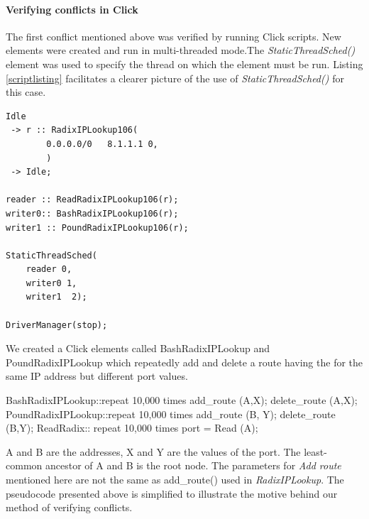 \documentclass{article}
\begin{document}
\paragraph{Verifying conflicts in Click}
The first conflict mentioned above was verified by running Click scripts. New elements were created and run in multi-threaded mode.The \emph{StaticThreadSched()} element was used to specify the thread on which the element must be run. Listing \ref{scriptlisting} facilitates a clearer picture of the use of \emph{StaticThreadSched()} for this case.
\begin{lstlisting}[caption = Click script for verifying reader-updater conflicts, label=scriptlisting]
Idle
 -> r :: RadixIPLookup106(
		0.0.0.0/0   8.1.1.1 0,
		) 
 -> Idle;

reader :: ReadRadixIPLookup106(r);
writer0:: BashRadixIPLookup106(r);
writer1 :: PoundRadixIPLookup106(r);

StaticThreadSched(
	reader 0,
	writer0 1,
	writer1  2);

DriverManager(stop);
\end{lstlisting}
We created a Click elements called BashRadixIPLookup and PoundRadixIPLookup which repeatedly add and delete a route having the for the same IP address but different port values.
\begin{code}
  BashRadixIPLookup::repeat 10,000 times {
    add_route (A,X);
    delete_route (A,X);
  }
  PoundRadixIPLookup::repeat 10,000 times {
    add_route (B, Y);
    delete_route (B,Y);
  } 
  ReadRadix:: repeat 10,000 times {
    port = Read (A);
  }
\end{code}
A and B are the addresses, X and Y are the values of the port. The least-common ancestor of A and B is the root node. The parameters for \emph{Add route} mentioned here are not the same as add\_route() used in \emph{RadixIPLookup}. The pseudocode presented above is simplified to illustrate the motive behind our method of verifying conflicts.
\end{document}
